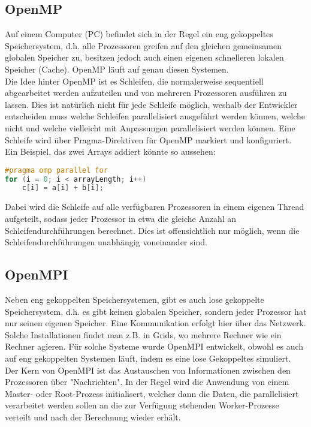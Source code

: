 \subsection{OpenMP}
Auf einem Computer (PC) befindet sich in der Regel ein eng gekoppeltes Speichersystem, d.h. alle Prozessoren greifen auf den gleichen gemeinsamen globalen Speicher zu, besitzen jedoch auch einen eigenen schnelleren lokalen Speicher (Cache). OpenMP läuft auf genau diesen Systemen.\\
Die Idee hinter OpenMP ist es Schleifen, die normalerweise sequentiell abgearbeitet werden aufzuteilen und von mehreren Prozessoren ausführen zu lassen. Dies ist natürlich nicht für jede Schleife möglich, weshalb der Entwickler entscheiden muss welche Schleifen parallelisiert ausgeführt werden können, welche nicht und welche vielleicht mit Anpassungen parallelisiert werden können. Eine Schleife wird über Pragma-Direktiven für OpenMP markiert und konfiguriert. Ein Beispiel, das zwei Arrays addiert könnte so aussehen:

\begin{lstlisting}[language=C]
#pragma omp parallel for
for (i = 0; i < arrayLength; i++)
    c[i] = a[i] + b[i];
\end{lstlisting}

Dabei wird die Schleife auf alle verfügbaren Prozessoren in einem eigenen Thread aufgeteilt, sodass jeder Prozessor in etwa die gleiche Anzahl an Schleifendurchführungen berechnet. Dies ist offensichtlich nur möglich, wenn die Schleifendurchführungen unabhängig voneinander sind.

\subsection{OpenMPI}
Neben eng gekoppelten Speichersystemen, gibt es auch lose gekoppelte Speichersystem, d.h. es gibt keinen globalen Speicher, sondern jeder Prozessor hat nur seinen eigenen Speicher. Eine Kommunikation erfolgt hier über das Netzwerk. Solche Installationen findet man z.B. in Grids, wo mehrere Rechner wie ein Rechner agieren. Für solche Systeme wurde OpenMPI entwickelt, obwohl es auch auf eng gekoppelten Systemen läuft, indem es eine lose Gekoppeltes simuliert.\\
Der Kern von OpenMPI ist das Austauschen von Informationen zwischen den Prozessoren über "Nachrichten". In der Regel wird die Anwendung von einem Master- oder Root-Prozess initialisert, welcher dann die Daten, die parallelisiert verarbeitet werden sollen an die zur Verfügung stehenden Worker-Prozesse verteilt und nach der Berechnung wieder erhält.

